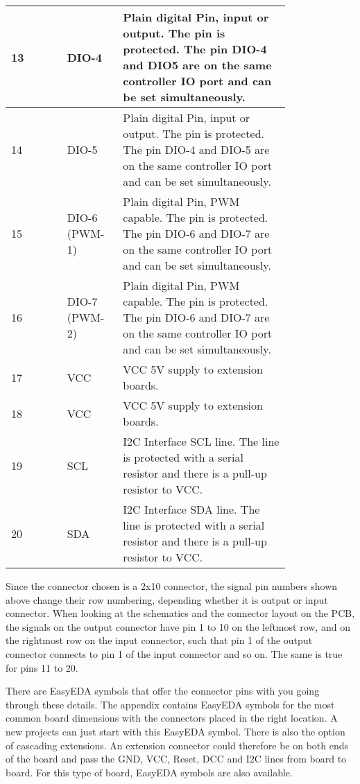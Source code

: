 \begin{longtable}{@{}|l|p{0.2\linewidth}p{0.6\linewidth}@{}}
    \midrule
    13 & DIO-4 & Plain digital Pin, input or output. The pin is protected. The pin DIO-4 and DIO5 are on the same controller IO port and can be set simultaneously. \\
    \midrule
    14 & DIO-5 & Plain digital Pin, input or output. The pin is protected. The pin DIO-4 and DIO-5 are on the same controller IO port and can be set simultaneously. \\
    \midrule
    15 & DIO-6 (PWM-1) & Plain digital Pin, PWM capable. The pin is protected. The pin DIO-6 and DIO-7 are on the same controller IO port and can be set simultaneously. \\
    \midrule
    16 & DIO-7 (PWM-2) & Plain digital Pin, PWM capable. The pin is protected. The pin DIO-6 and DIO-7 are on the same controller IO port and can be set simultaneously. \\
    \midrule
    17 & VCC & VCC 5V supply to extension boards. \\
    \midrule
    18 & VCC & VCC 5V supply to extension boards. \\
    \midrule
    19 & SCL & I2C Interface SCL line. The line is protected with a serial resistor and there is a pull-up resistor to VCC. \\
    \midrule
    20 & SDA & I2C Interface SDA line. The line is protected with a serial resistor and there is a pull-up resistor to VCC. \\
\end{longtable}

Since the connector chosen is a 2x10 connector, the signal pin numbers shown above change their row numbering, depending whether it is output or input connector. When looking at the schematics and the connector layout on the PCB, the signals on the output connector have pin 1 to 10 on the leftmost row, and on the rightmost row on the input connector, such that pin 1 of the output connector connects to pin 1  of the input connector and so on. The same is true for pins 11 to 20. 

There are EasyEDA symbols that offer the connector pins with you going through these details. The appendix contains EasyEDA symbols for the most common board dimensions with the connectors placed in the right location. A new projects can just start with this EasyEDA symbol. There is also the option of  cascading extensions. An extension connector could therefore be on both ends of the board and pass the GND, VCC, Reset, DCC and I2C lines from board to board. For this type of board, EasyEDA symbols are also available.

